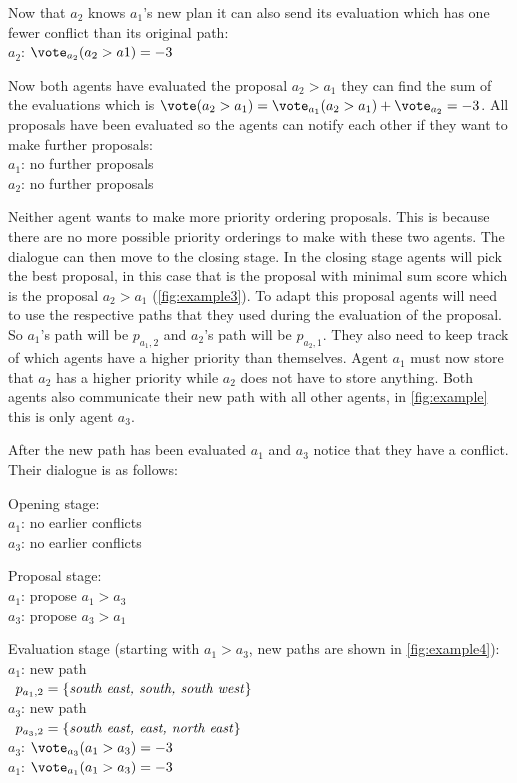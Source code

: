 \noindent Now that $a_2$ knows $a_1$'s new plan it can also send its evaluation 
which has 
one fewer conflict than its original path:
\\ \-\qquad $a_2$: $\vote_{a_2}(a_2 > a1) = -3$

\noindent Now both agents have evaluated the proposal $a_2 > a_1$ they can find 
the sum 
of the evaluations which is $\vote(a_2 > a_1) = \vote_{a_1}(a_2 > a_1) + 
\vote_{a_2} = -3$. All proposals have been evaluated so the agents can notify 
each other if they want to make further proposals:
\\ \-\qquad $a_1$: no further proposals
\\ \-\qquad $a_2$: no further proposals

\noindent Neither agent wants to make more priority ordering proposals. This is 
because 
there are no more possible priority orderings to make with these two agents. 
The dialogue can then move to the closing stage. In the closing stage agents 
will pick the best proposal, in this case that is the proposal with minimal 
sum score which is the proposal $a_2 > a_1$ (\autoref{fig:example3}). To adapt 
this proposal agents will need to use the respective paths that they used 
during the evaluation of the proposal. So $a_1$'s path will be $p_{a_1,2}$ and 
$a_2$'s path will be $p_{a_2,1}$. They also need to keep track of which agents 
have a higher priority than themselves. Agent $a_1$ must now store that $a_2$ 
has a higher priority while $a_2$ does not have to store anything. Both agents 
also communicate their new path with all other agents, in \autoref{fig:example} 
this is only agent $a_3$.

After the new path has been evaluated $a_1$ and $a_3$ notice that they have a 
conflict. Their dialogue is as follows:

\noindent Opening stage:
\\ \-\qquad $a_1$: no earlier conflicts
\\ \-\qquad $a_3$: no earlier conflicts

\noindent Proposal stage:
\\ \-\qquad $a_1$: propose $a_1 > a_3$
\\ \-\qquad $a_3$: propose $a_3 > a_1$

\noindent Evaluation stage (starting with $a_1 > a_3$, new paths are shown in 
\autoref{fig:example4}):
\\ \-\qquad $a_1$: new path
\\ \-\qquad\quad\,\; $p_{a_1,2} = \{\text{\emph{south east, south, south 
west}}\}$
\\ \-\qquad $a_3$: new path
\\ \-\qquad\quad\,\; $p_{a_3,2} = \{\text{\emph{south east, east, north 
east}}\}$
\\ \-\qquad $a_3$: $\vote_{a_3}(a_1 > a_3) = -3$
\\ \-\qquad $a_1$: $\vote_{a_1}(a_1 > a_3) = -3$

